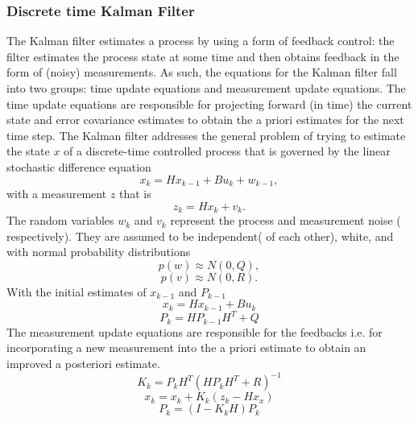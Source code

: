 \documentclass[a4paper,10pt]{report}
\begin{document}
\subsubsection{Discrete time Kalman Filter}
The Kalman filter estimates a process by using a form of feedback
control: the filter estimates the process state at some time and
then obtains feedback in the form of (noisy) measurements. As such,
the equations for the Kalman filter fall into two groups: time
update equations and measurement update equations. The time update
equations are responsible for projecting forward (in time) the
current state and error covariance estimates to obtain the a priori
estimates for the next time step.
\newline
The Kalman filter addresses the general problem of trying to
estimate the state $x$ of a discrete-time controlled process that is
governed by the linear stochastic difference equation
\begin{equation}
 x_k = Hx_{k-1} + Bu_k + w_{k-1} ,
\end{equation}
with a measurement $z$ that is
\begin{equation}
 z_k = Hx_k + v_k.
\end{equation}
The random variables $w_k$ and $v_k$ represent the process and
measurement noise ( respectively). They are assumed to be
independent( of each other), white, and with normal probability
distributions
\begin{equation}
 p(w) \approx N(0,Q),
\end{equation}
\begin{equation}
 p(v) \approx N(0,R).
\end{equation}
With the initial estimates of $x_{k-1}$ and $P_{k-1}$
\begin{equation}
x_k = Hx_{k-1} + Bu_k
\end{equation}
\begin{equation}
P_k = HP_{k-1}H^T + Q
\end{equation}
The measurement update equations are responsible for the feedbacks
i.e. for incorporating a new measurement into the a priori estimate
to obtain an improved a posteriori estimate.
\begin{equation}
K_k = P_kH^T(HP_kH^T + R)^{-1} \label{kalmangain}
\end{equation}
\begin{equation}
x_k = x_k + K_k(z_k - Hx_x)
\end{equation}
\begin{equation}
P_k = (I-K_kH)P_k
\end{equation}
\end{document}
